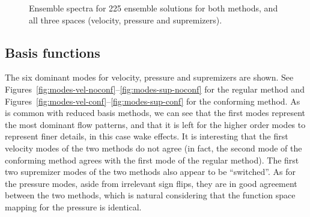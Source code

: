 \documentclass[onecolumn, twoside, a4paper, 11pt]{article}
\begin{document}
\begin{figure}
  \caption{
    Ensemble spectra for 225 ensemble solutions for both methods, and all three
    spaces (velocity, pressure and supremizers).
  }
  \label{fig:spectra}
\end{figure}

\subsection{Basis functions}

The six dominant modes for velocity, pressure and supremizers are shown. See
Figures~\ref{fig:modes-vel-noconf}--\ref{fig:modes-sup-noconf} for the regular method and
Figures~\ref{fig:modes-vel-conf}--\ref{fig:modes-sup-conf} for the conforming method. As is common
with reduced basis methods, we can see that the first modes represent the most dominant flow
patterns, and that it is left for the higher order modes to represent finer details, in this case
wake effects. It is interesting that the first velocity modes of the two methods do not agree (in
fact, the second mode of the conforming method agrees with the first mode of the regular
method). The first two supremizer modes of the two methods also appear to be ``switched''. As for
the pressure modes, aside from irrelevant sign flips, they are in good agreement between the two
methods, which is natural considering that the function space mapping for the pressure is identical.
\end{document}
